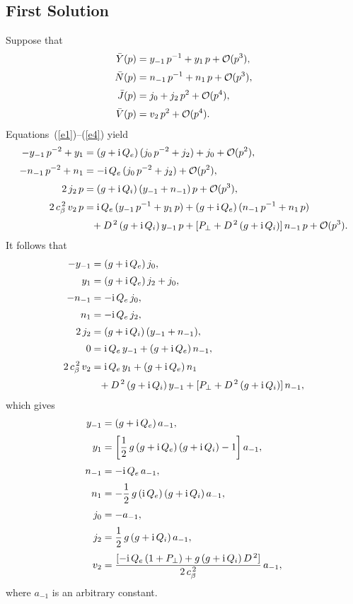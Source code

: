 \documentclass[12pt,prb,aps,notitlepage]{revtex4-1}
\begin{document}
\subsection{First Solution}
Suppose that 
\begin{align}
\bar{Y}(p) &=y_{-1}\,p^{-1} + y_1\,p + {\cal O}(p^3),\\[0.5ex]
\bar{N}(p) &= n_{-1}\,p^{-1}+n_1\,p + {\cal O}(p^3),\\[0.5ex]
\bar{J}(p) &= j_0 + j_2\,p^2+ {\cal O}(p^4),\\[0.5ex]
\bar{V}(p) &= v_2\,p^2+ {\cal O}(p^4).
\end{align}
Equations~(\ref{e1})--(\ref{e4}) yield 
\begin{align}
-y_{-1}\,p^{-2} + y_1 &= (g+{\rm i}\,Q_e)\,(j_0\,p^{-2}+j_2) + j_0 + {\cal O}(p^2),\\[0.5ex]
-n_{-1}\,p^{-2} + n_1 &= -{\rm i}\,Q_e\,(j_0\,p^{-2}+j_2)+ {\cal O}(p^2),\\[0.5ex]
2\,j_2\,p &= (g+{\rm i}\,Q_i)\,(y_{-1}+n_{-1})\,p+ {\cal O}(p^3),\\[0.5ex]
2\,c_\beta^{\,2}\,v_2\,p &={\rm i}\,Q_e\,(y_{-1}\,p^{-1} +y_1\,p) + (g+{\rm i}\,Q_e)\,(n_{-1}\,p^{-1}+ n_1\,p)\nonumber\\[0.5ex]&\phantom{=}
+ D^{\,2}\,(g+{\rm i}\,Q_i)\,y_{-1}\,p + [P_\perp + D^{\,2}\,(g+{\rm i}\,Q_i)]\,n_{-1}\,p+ {\cal O}(p^3).
\end{align}
It follows that
\begin{align}
-y_{-1}&= (g+{\rm i}\,Q_e)\,j_0,\\[0.5ex]
y_1 &= (g+{\rm i}\,Q_e)\,j_2 + j_0,\\[0.5ex]
-n_{-1}&= -{\rm i}\,Q_e\,j_0,\\[0.5ex]
n_1 &= -{\rm i}\,Q_e\,j_2,\\[0.5ex]
2\,j_2 &= (g+{\rm i}\,Q_i)\,(y_{-1}+n_{-1}),\\[0.5ex]
0 &= {\rm i}\,Q_e\,y_{-1} + (g+{\rm i}\,Q_e)\,n_{-1},\\[0.5ex]
2\,c_\beta^{\,2}\,v_2 &= {\rm i}\,Q_e\,y_1 + (g+{\rm i}\,Q_e)\,n_1\nonumber\\[0.5ex]
&\phantom{=} + D^{\,2}\,(g+{\rm i}\,Q_i)\,y_{-1} + [P_\perp+ D^{\,2}\,(g+{\rm i}\,Q_i)]\,n_{-1},
\end{align}
which gives
\begin{align}
y_{-1} &= (g+{\rm i}\,Q_e)\,a_{-1},\label{ym1}\\[0.5ex]
y_1 &=\left[\frac{1}{2}\,g\,(g+{\rm i}\,Q_e)\,(g+{\rm i}\,Q_i) - 1\right]a_{-1},\\[0.5ex]
n_{-1}&= -{\rm i}\,Q_e\,a_{-1},\label{nm1}\\[0.5ex]
n_1&= - \frac{1}{2}\,g\,({\rm i}\,Q_e)\,(g+{\rm i}\,Q_i)\,a_{-1},\\[0.5ex]
j_0 &= -a_{-1},\\[0.5ex]
j_2&= \frac{1}{2}\,g\,(g+{\rm i}\,Q_i)\,a_{-1},\\[0.5ex]
v_2 &= \frac{[-{\rm i}\,Q_e\,(1+P_\perp) + g\,(g+{\rm i}\,Q_i)\,D^{\,2}]}{2\,c_\beta^{\,2}}\,a_{-1},
\end{align}
where $a_{-1}$ is an arbitrary constant. 
\end{document}

